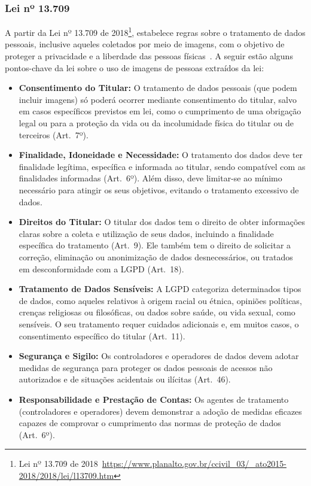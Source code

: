 \subsubsection{Lei nº 13.709}
A partir da Lei nº 13.709 de 2018\footnote{Lei nº 13.709 de 2018~\url{https://www.planalto.gov.br/ccivil_03/_ato2015-2018/2018/lei/l13709.htm}}, estabelece regras sobre o tratamento de dados pessoais, inclusive aqueles coletados por meio de imagens, com o objetivo de proteger a privacidade e a liberdade das pessoas físicas~\cite{brasil2018lgpd}.
A seguir estão alguns pontos-chave da lei sobre o uso de imagens de pessoas extraídos da lei:

\begin{itemize}
    \item \textbf{Consentimento do Titular:} O tratamento de dados pessoais (que podem incluir imagens) só poderá ocorrer mediante consentimento do titular, salvo em casos específicos previstos em lei, como o cumprimento de uma obrigação legal ou para a proteção da vida ou da incolumidade física do titular ou de terceiros (Art.\ 7º).

    \item \textbf{Finalidade, Idoneidade e Necessidade:} O tratamento dos dados deve ter finalidade legítima, específica e informada ao titular, sendo compatível com as finalidades informadas (Art.\ 6º).
    Além disso, deve limitar-se ao mínimo necessário para atingir os seus objetivos, evitando o tratamento excessivo de dados.

    \item \textbf{Direitos do Titular:} O titular dos dados tem o direito de obter informações claras sobre a coleta e utilização de seus dados, incluindo a finalidade específica do tratamento (Art.\ 9).
    Ele também tem o direito de solicitar a correção, eliminação ou anonimização de dados desnecessários, ou tratados em desconformidade com a LGPD (Art.\ 18).

    \item \textbf{Tratamento de Dados Sensíveis:} A LGPD categoriza determinados tipos de dados, como aqueles relativos à origem racial ou étnica, opiniões políticas, crenças religiosas ou filosóficas, ou dados sobre saúde, ou vida sexual, como sensíveis.
    O seu tratamento requer cuidados adicionais e, em muitos casos, o consentimento específico do titular (Art.\ 11).

    \item \textbf{Segurança e Sigilo:} Os controladores e operadores de dados devem adotar medidas de segurança para proteger os dados pessoais de acessos não autorizados e de situações acidentais ou ilícitas (Art.\ 46).

    \item \textbf{Responsabilidade e Prestação de Contas:} Os agentes de tratamento (controladores e operadores) devem demonstrar a adoção de medidas eficazes capazes de comprovar o cumprimento das normas de proteção de dados (Art.\ 6º).
\end{itemize}

